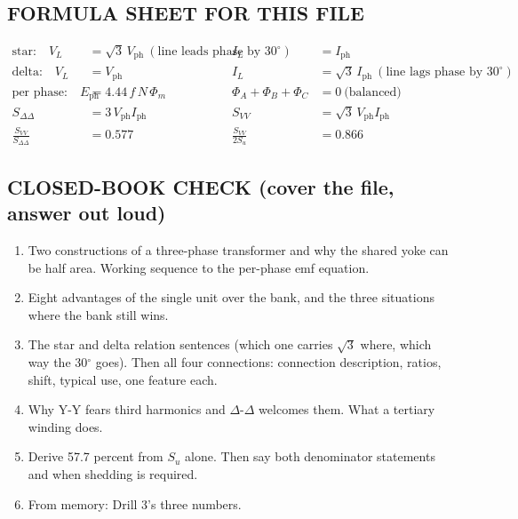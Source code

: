 \documentclass[11pt]{article}
\begin{document}
\hrulefill
\subsection*{\color{copper}FORMULA SHEET FOR THIS FILE}
\begin{align*}
\text{star:}\quad V_L &= \sqrt{3}\, V_{\text{ph}}\ (\text{line leads phase by } 30^{\circ})
& I_L &= I_{\text{ph}} \\[4pt]
\text{delta:}\quad V_L &= V_{\text{ph}}
& I_L &= \sqrt{3}\, I_{\text{ph}}\ (\text{line lags phase by } 30^{\circ}) \\[4pt]
\text{per phase:}\quad E_{\text{ph}} &= 4.44\, f\, N\, \Phi_m
& \Phi_A + \Phi_B + \Phi_C &= 0\ \text{(balanced)} \\[4pt]
S_{\Delta\Delta} &= 3\, V_{\text{ph}} I_{\text{ph}}
& S_{VV} &= \sqrt{3}\, V_{\text{ph}} I_{\text{ph}} \\[4pt]
\frac{S_{VV}}{S_{\Delta\Delta}} &= 0.577
& \frac{S_{VV}}{2 S_u} &= 0.866
\end{align*}

\subsection*{\color{copper}CLOSED-BOOK CHECK (cover the file, answer out loud)}
\begin{enumerate}[label=\arabic*.]
\item Two constructions of a three-phase transformer and why the shared yoke can be half area. Working sequence to the per-phase emf equation.
\item Eight advantages of the single unit over the bank, and the three situations where the bank still wins.
\item The star and delta relation sentences (which one carries $\sqrt{3}$ where, which way the 30$^\circ$ goes). Then all four connections: connection description, ratios, shift, typical use, one feature each.
\item Why Y-Y fears third harmonics and $\Delta$-$\Delta$ welcomes them. What a tertiary winding does.
\item Derive 57.7 percent from $S_u$ alone. Then say both denominator statements and when shedding is required.
\item From memory: Drill 3's three numbers.
\end{enumerate}
\end{document}

